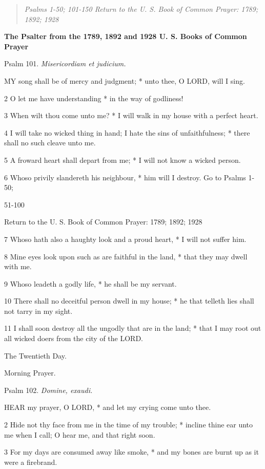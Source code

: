 \begin{quote}

\emph{Psalms 1-50;
101-150 Return to the U. S. Book of Common Prayer: 1789;
1892; 1928}

\end{quote}


\textbf{The Psalter from the 1789, 1892 and 1928 U. S. Books of Common
Prayer}

Psalm
101. \emph{Misericordiam et judicium.}

MY
song shall be of mercy and judgment; * unto thee, O LORD, will I sing.

2 O let me have understanding * in the way of godliness!

3 When wilt thou come unto me? * I will walk in my
house with a perfect heart.

4 I will take no wicked thing in hand; I hate the sins
of unfaithfulness; * there shall no such cleave unto me.

5 A froward heart shall depart from me; * I will not
know a wicked person.

6 Whoso privily slandereth his neighbour, * him will
I destroy. Go
to Psalms 1-50; 

51-100

Return to the U. S. Book of Common Prayer: 1789;
1892; 1928

7 Whoso hath also a haughty look and a proud heart, * I will not suffer
him.

8 Mine eyes look upon such as are faithful in the land,
* that they may dwell with me.

9 Whoso leadeth a godly life, * he shall be my servant.

10 There shall no deceitful person dwell in my house;
* he that telleth lies shall not tarry in my sight.

11 I shall soon destroy all the ungodly that are in
the land; * that I may root out all wicked doers from the city of the
LORD. 

The
Twentieth Day.

Morning
Prayer.

Psalm
102. \emph{Domine, exaudi.}

HEAR
my prayer, O LORD, * and let my crying come unto thee.

2 Hide not thy face from me in the time of my trouble;
* incline thine ear unto me when I call; O hear me, and that right soon.

3 For my days are consumed away like smoke, * and my
bones are burnt up as it were a firebrand.

